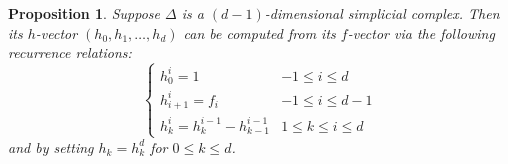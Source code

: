 \documentclass[12pt,a4paper]{article}
\newtheorem{proposition}[theorem]{Proposition}
\theoremstyle{definition}
\numberwithin{equation}{section}
\begin{document}
\begin{proposition}
    Suppose $\Delta$ is a $(d-1)$-dimensional simplicial complex.
    Then its $h$-vector $(h_0,h_1,\dots,h_d)$ can be computed from its $f$-vector via the following recurrence relations:
    \begin{equation*}
        \begin{cases}
            h_0^i = 1 & -1 \leq i \leq d \\
            h_{i+1}^i = f_i & -1 \leq i \leq d-1 \\
            h_k^i = h_k^{i-1} - h_{k-1}^{i-1} & 1 \leq k \leq i \leq d
        \end{cases}
    \end{equation*}
    and by setting $h_k = h_k^d$ for $0 \leq k \leq d$.
\end{proposition}
\end{document}
